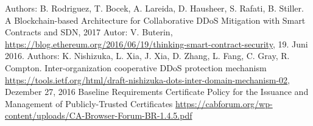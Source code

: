 \begin{thebibliography}{99}

 Authors: B. Rodriguez, T. Bocek, A. Lareida, D. Hausheer, S. Rafati, B. Stiller. A Blockchain-based Architecture for Collaborative DDoS Mitigation with Smart Contracts and SDN, 2017
 Autor: V. Buterin, \url{https://blog.ethereum.org/2016/06/19/thinking-smart-contract-security}, 19. Juni 2016.
Authors: K. Nishizuka, L. Xia, J. Xia, D. Zhang, L. Fang, C. Gray, R. Compton. Inter-organization cooperative DDoS protection mechanism \url{https://tools.ietf.org/html/draft-nishizuka-dots-inter-domain-mechanism-02}, Dezember 27, 2016
 Baseline Requirements Certificate Policy for the Issuance and Management of Publicly-Trusted Certificates \url{https://cabforum.org/wp-content/uploads/CA-Browser-Forum-BR-1.4.5.pdf}
\end{thebibliography}


